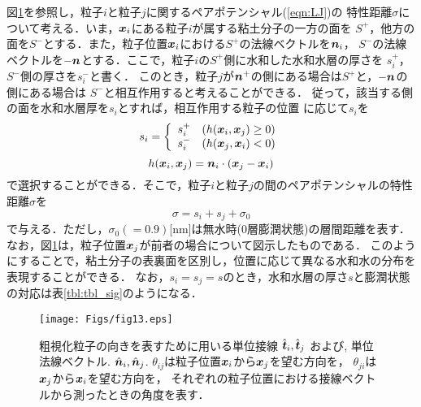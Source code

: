 図\ref{fig:fig13}を参照し，粒子$i$と粒子$j$に関するペアポテンシャル(\ref{eqn:LJ})の
特性距離$\sigma$について考える．いま，$\mbox{\boldmath $x$}_i$にある粒子$i$が属する粘土分子の一方の面を
$S^+$，他方の面を$S^-$とする．また，粒子位置$\mbox{\boldmath $x$}_i$における$S^+$の法線ベクトルを$\mbox{\boldmath $n$}_i$，
$S^-$の法線ベクトルを$-\mbox{\boldmath $n$}$とする．ここで，粒子$i$の$S^+$側に水和した水和水層の厚さを
$s_i^+$，$S^-$側の厚さを$s_i^-$と書く．
このとき，粒子$j$が$\mbox{\boldmath $n$}^+$の側にある場合は$S^+$と，$-\mbox{\boldmath $n$}$の側にある場合は
$S^-$と相互作用すると考えることができる．
従って，該当する側の面を水和水層厚を$s_i$とすれば，相互作用する粒子の位置
に応じて$s_i$を
\begin{equation}
	s_i=\left\{
	\begin{array}{cc}
		s_i^+ & (h(\mbox{\boldmath $x$}_i,\mbox{\boldmath $x$}_j) \ge 0)\\
		s_i^- & (h(\mbox{\boldmath $x$}_j,\mbox{\boldmath $x$}_i) <0)
	\end{array}
	\right.
	\label{eqn:si_switch}
\end{equation}
\begin{equation}
	h(\mbox{\boldmath $x$}_i,\mbox{\boldmath $x$}_j) =\mbox{\boldmath $n$}_i\cdot \left(\mbox{\boldmath $x$}_j-\mbox{\boldmath $x$}_i\right)
	\label{eqn:h_sgn}
\end{equation}
で選択することができる．そこで，粒子$i$と粒子$j$の間のペアポテンシャルの特性距離$\sigma$を
\begin{equation}
	\sigma=s_i+s_j+\sigma_0
	\label{eqn:sig_ij}
\end{equation}
で与える．ただし，$\sigma_0(=0.9)$[nm]は無水時(0層膨潤状態)の層間距離を表す．
なお，図\ref{fig:fig13}は，粒子位置$\mbox{\boldmath $x$}_j$が前者の場合について図示したものである．
このようにすることで，粘土分子の表裏面を区別し，位置に応じて異なる水和水の分布を表現することができる．
なお，$s_i=s_j=s$のとき，水和水層の厚さ$s$と膨潤状態の対応は表\ref{tbl:tbl_sig}のようになる．
\begin{figure}[h]
	\begin{center}
	\texttt{[image: Figs/fig13.eps]} 
	\end{center}
	\caption{
		粗視化粒子の向きを表すために用いる単位接線
		$\hat{\mbox{\boldmath $t$}}_i,\hat{\mbox{\boldmath $t$}}_j$
		および, 単位法線ベクトル.
		$\hat{\mbox{\boldmath $n$}}_i,\hat{\mbox{\boldmath $n$}}_j$. 
		$\theta_{ij}$は粒子位置$\mbox{\boldmath $x$}_i$から$\mbox{\boldmath $x$}_j$を望む方向を，
		$\theta_{ji}$は$\mbox{\boldmath $x$}_j$から$\mbox{\boldmath $x$}_i$を望む方向を，
		それぞれの粒子位置における接線ベクトルから測ったときの角度を表す．
	} 
	\label{fig:fig13}
\end{figure}
